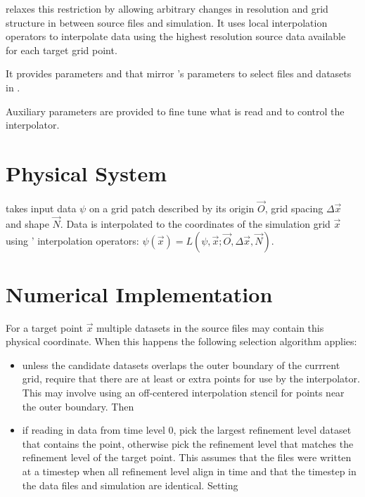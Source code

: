  relaxes this restriction by allowing arbitrary changes
in resolution and grid structure in between source files and simulation. It
uses  local interpolation operators
 to interpolate data using the highest
resolution source data available for each target grid point.

It provides parameters  and
 that mirror 's parameters to select
files and datasets in .

Auxiliary parameters are provided to fine tune what is read and to control the
interpolator.

\section{Physical System}
 takes input data $\psi$ on a grid patch described by
its origin $\vec O$, grid spacing $\Delta \vec x$ and shape $\vec N$. Data is
interpolated to the coordinates of the simulation grid $\vec x$ using
' interpolation operators: $\psi(\vec x) = L(\psi, \vec x; \vec
O, \Delta \vec x, \vec N)$.

\section{Numerical Implementation}
For a target point $\vec x$ multiple datasets in the source files may contain
this physical coordinate. When this happens the following selection
algorithm applies:

\begin{itemize}
\item unless the candidate datasets overlaps the outer boundary of the
currrent grid, require that there are at least  or
 extra points for use by the interpolator. This
may involve using an off-centered interpolation stencil for points near the
outer boundary. Then
\item if reading in data from time level 0, pick the largest refinement level
dataset that contains the point, otherwise pick the refinement level that
matches the refinement level of the target point. This assumes that the files
were written at a timestep when all refinement level align in time and that
the timestep in the data files and simulation are identical. Setting 
\end{itemize}

